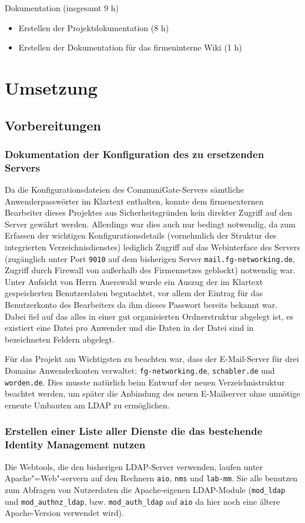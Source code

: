 \documentclass[11pt,a4paper,titlepage=firstiscover,headsepline,bibtotoc]{scrartcl} %
\begin{document}
Dokumentation (insgesamt 9 h)
	\begin{itemize}
	\item Erstellen der Projektdokumentation (8 h)
	\item Erstellen der Dokumentation für das firmeninterne Wiki (1 h)
	\end{itemize}

\section{Umsetzung}
\subsection{Vorbereitungen}
\subsubsection{Dokumentation der Konfiguration des zu ersetzenden Servers}\label{sec:Konfig-Doku-Alt}
Da die Konfigurationsdateien des CommuniGate-Servers sämtliche Anwenderpasswörter im Klartext enthalten, konnte dem firmenexternen Bearbeiter dieses Projektes aus Sicherheitsgründen kein direkter Zugriff auf den Server gewährt werden. Allerdings war dies auch nur bedingt notwendig, da zum Erfassen der wichtigen Konfigurationsdetails (vornehmlich der Struktur des integrierten Verzeichnisdienstes) lediglich Zugriff auf das Webinterface des Servers (zugänglich unter Port \texttt{9010} auf dem bisherigen Server \texttt{mail.fg-networking.de}, Zugriff durch Firewall von außerhalb des Firmennetzes geblockt) notwendig war. Unter Aufsicht von Herrn Auerswald wurde ein Auszug der im Klartext gespeicherten Benutzerdaten begutachtet, vor allem der Eintrag für das Benutzerkonto des Bearbeiters da ihm dieses Passwort bereits bekannt war. Dabei fiel auf das alles in einer gut organisierten Ordnerstruktur abgelegt ist, es existiert eine Datei pro Anwender und die Daten in der Datei sind in bezeichneten Feldern abgelegt.

Für das Projekt am Wichtigsten zu beachten war, dass der E-Mail-Server für drei Domains Anwenderkonten verwaltet: \texttt{fg-networking.de}, \texttt{schabler.de} und \texttt{worden.de}. Dies musste natürlich beim Entwurf der neuen Verzeichnistruktur beachtet werden, um später die Anbindung des neuen E-Mailserver ohne unnötige erneute Umbauten am LDAP zu ermöglichen.

\subsubsection{Erstellen einer Liste aller Dienste die das bestehende Identity Management nutzen}
Die Webtools, die den bisherigen LDAP-Server verwenden, laufen unter Apache"=Web"-servern auf den Rechnern \texttt{aio}, \texttt{nms} und \texttt{lab-mm}. Sie alle benutzen zum Abfragen von Nutzerdaten die Apache-eigenen LDAP-Module (\texttt{mod\_ldap} und \texttt{mod\_authnz\_ldap}, bzw. \texttt{mod\_auth\_ldap} auf \texttt{aio} da hier noch eine ältere Apache-Version verwendet wird). 
\end{document}
